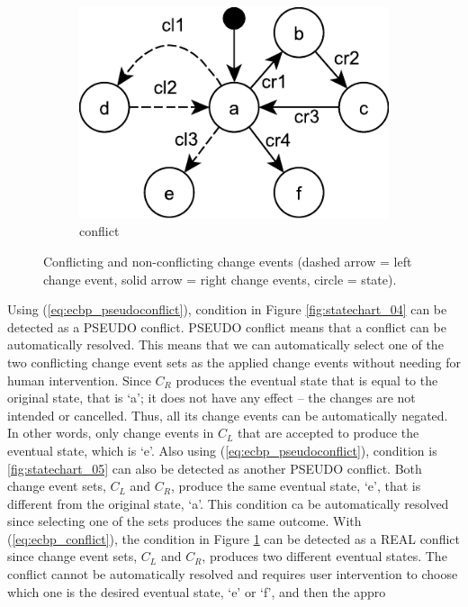 \begin{figure}[ht]
\begin{subfigure}[t]{0.48\linewidth}
    \includegraphics[width=\linewidth]{statechart_06}
    \caption{conflict}
    \label{fig:statechart_06}
  \end{subfigure}
  \caption{Conflicting and non-conflicting change events (dashed arrow = left change event, solid arrow = right change events, circle = state).}
  \label{fig:conflict_states}
\end{figure}

Using (\ref{eq:ecbp_pseudoconflict}), condition in Figure \ref{fig:statechart_04} can be detected as a \textsf{PSEUDO} conflict. \textsf{PSEUDO} conflict means that a conflict can be automatically resolved. This means that we can automatically select one of the two conflicting change event sets as the applied change events without needing for human intervention. Since $C_{R}$ produces the eventual state that is equal to the original state, that is `a'; it does not have any effect -- the changes are not intended or cancelled. Thus, all its change events can be automatically negated. In other words, only change events in $C_{L}$ that are accepted to produce the eventual state, which is `e'. Also using (\ref{eq:ecbp_pseudoconflict}), condition is \ref{fig:statechart_05} can also be detected as another \textsf{PSEUDO} conflict. Both change event sets, $C_{L}$ and $C_{R}$, produce the same eventual state, `e', that is different from the original state, `a'. This condition ca be automatically resolved since selecting one of the sets produces the same outcome. With (\ref{eq:ecbp_conflict}), the condition in Figure \ref{fig:statechart_06} can be detected as a \textsf{REAL} conflict since change event sets, $C_{L}$ and $C_{R}$, produces two different eventual states. The conflict cannot be automatically resolved and requires user intervention to choose which one is the desired eventual state, `e' or `f', and then the appro

